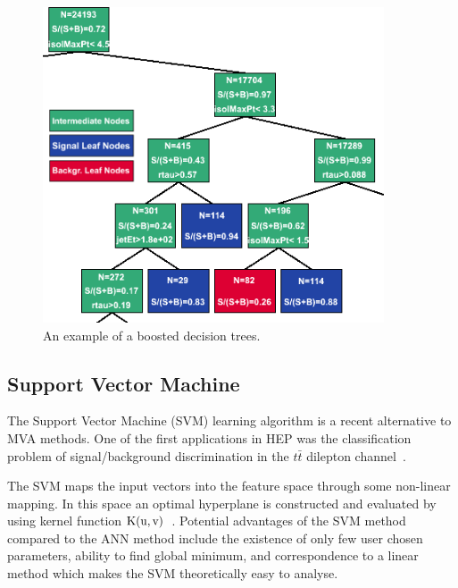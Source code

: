 \documentclass[a4paper]{jpconf}
\begin{document}


\begin{figure}[h]
 \begin{minipage}{7.8cm}
\includegraphics[width=0.9\textwidth]{images/bdt.png}
\end{minipage}
 \hfill
\begin{minipage}{7.8cm}
\end{minipage}

\caption{An example of a boosted decision trees.}
\label{fig:bdt}
\end{figure}

\subsection{Support Vector Machine}
The Support Vector Machine (SVM) learning algorithm is a recent alternative to MVA methods.
One of the first applications in HEP was the classification problem 
of signal/background discrimination in the $t\bar{t}$ dilepton channel~\cite{svmtt}.


The SVM maps the input vectors into the feature space through some
non-linear mapping. 
In this space an optimal hyperplane is constructed  and evaluated by using kernel function
${\rm K(u,v)}$~\cite{svmintro}. 
Potential advantages of the SVM method compared to the ANN method
include the existence of only few user chosen parameters, ability to find global minimum, and
correspondence to a linear method which makes the SVM theoretically easy to analyse.
\end{document}
